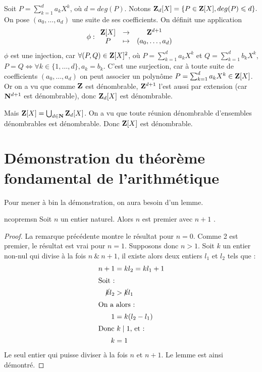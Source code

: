 \documentclass[a4paper,french,final]{memoir}
\begin{document}
Soit $P = \sum_{k = 1}^d a_k X^k $, où $d = deg(P)$. Notons $\mathbf{Z}_d[X] = \{P \in \mathbf{Z}[X], deg(P) \leqslant d \}.$
On pose  $(a_0, \dots, a_d) $ une suite de ses coefficients. On définit une application \[\phi : \begin{array}{ccc}
\ZZ[X] & \to & \ZZ^{d+1}\\
P & \mapsto & (a_0, \dots, a_d)
\end{array}\]
$\phi$ est une injection, car $\forall (P,Q) \in \mathbf{Z}[X]^2$, où $P = \sum_{k=1}^d a_k X^k$ et $Q = \sum_{k=1}^d b_k X^k$, $ P = Q \iff \forall k \in \{1,\dots, d\}, a_k = b_k$. C'est une surjection, car à toute suite de coefficients $(a_0,\dots, a_d)$ on peut associer un polynôme $P = \sum_{k=1}^d a_k X^k \in \mathbf{Z}[X]$. Or on a vu que comme $\mathbf{Z}$ est dénombrable, $\mathbf{Z}^{d+1}$ l'est aussi par extension (car $\mathbf{N}^{d+1}$ est dénombrable), donc $\mathbf{Z}_d[X]$ est dénombrable.

\noindent Mais $\mathbf{Z}[X] = \bigcup_{d \in \mathbf{N}} \mathbf{Z}_d[X]$. On a vu que toute réunion dénombrable d'ensembles dénombrables est dénombrable. Donc $\mathbf{Z}[X]$ est dénombrable.
\raggedright
\begingroup
\nocite{*}
\printbibliography
\endgroup
\appendixpage
\appendix
\chapter{Démonstration du théorème fondamental de l'arithmétique}\label{annexe:thmfondarith}
Pour mener à bin la démonstration, on aura besoin d'un lemme.
\begin{lemmab}{}{ncopremsn}
  Soit $n$ un entier naturel. Alors $n$ est premier avec $n+1$ .
\end{lemmab}
\begin{proof}
La remarque précédente montre le résultat pour $n=0$. Comme 2 est premier, le résultat est vrai pour $n=1$. Supposons donc $n>1$. Soit  $k$ un entier non-nul qui divise à la fois $n~\&~n+1$, il existe alors deux entiers $l_1$ et $l_2$ tels que :  
\begin{align*}
  n+1& =kl_2=kl_{1}+1\\
\shortintertext{Soit~:} 
\cancel{k}l_2& >\cancel{k}l_1\\
\shortintertext{On a alors~:} 
1& =k(l_2-l_1)\\
\intertext{Donc $k \mid 1$, et : }
k& =1
\end{align*}
Le seul entier qui puisse diviser à la fois $n$ et $n+1$. Le lemme est ainsi démontré.
\end{proof}
\end{document}

